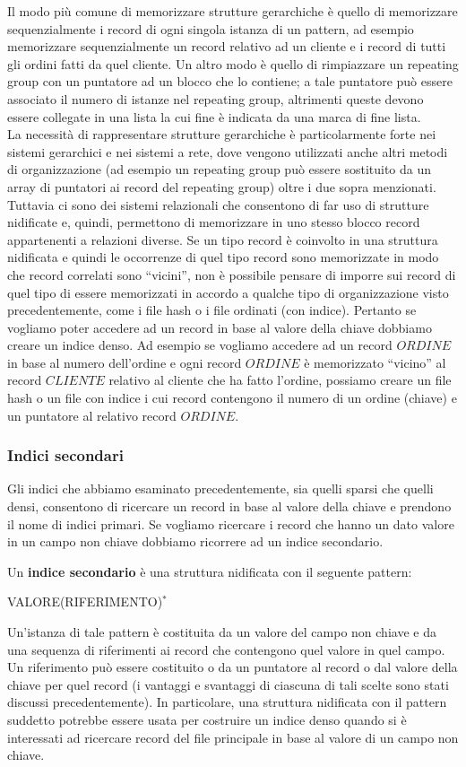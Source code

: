 Il modo più comune di memorizzare strutture gerarchiche è quello di memorizzare sequenzialmente
i record di ogni singola istanza di un pattern, ad esempio memorizzare sequenzialmente un record
relativo ad un cliente e i record di tutti gli ordini fatti da quel cliente. Un altro modo è quello di
rimpiazzare un repeating group con un puntatore ad un blocco che lo contiene; a tale puntatore può
essere associato il numero di istanze nel repeating group, altrimenti queste devono essere collegate
in una lista la cui fine è indicata da una marca di fine lista.\\
La necessità di rappresentare strutture gerarchiche è particolarmente forte nei sistemi gerarchici e
nei sistemi a rete, dove vengono utilizzati anche altri metodi di organizzazione (ad esempio un
repeating group può essere sostituito da un array di puntatori ai record del repeating group) oltre i
due sopra menzionati. Tuttavia ci sono dei sistemi relazionali che consentono di far uso di strutture
nidificate e, quindi, permettono di memorizzare in uno stesso blocco record appartenenti a relazioni
diverse.
Se un tipo record è coinvolto in una struttura nidificata e quindi le occorrenze di quel tipo record
sono memorizzate in modo che record correlati sono ``vicini'', non è possibile pensare di imporre sui
record di quel tipo di essere memorizzati in accordo a qualche tipo di organizzazione visto
precedentemente, come i file hash o i file ordinati (con indice). Pertanto se vogliamo poter accedere
ad un record in base al valore della chiave dobbiamo creare un indice denso. Ad esempio se
vogliamo accedere ad un record $ORDINE$ in base al numero dell'ordine e ogni record $ORDINE$ è
memorizzato ``vicino'' al record $CLIENTE$ relativo al cliente che ha fatto l'ordine, possiamo creare
un file hash o un file con indice i cui record contengono il numero di un ordine (chiave) e un
puntatore al relativo record $ORDINE$.

\subsubsection{Indici secondari}
Gli indici che abbiamo esaminato precedentemente, sia quelli sparsi che quelli densi, consentono di
ricercare un record in base al valore della chiave e prendono il nome di indici primari. Se vogliamo
ricercare i record che hanno un dato valore in un campo non chiave dobbiamo ricorrere ad un indice
secondario. 
\begin{defn}
 Un \textbf{indice secondario} è una struttura nidificata con il seguente pattern:
 \begin{center}
VALORE(RIFERIMENTO)$^*$  
 \end{center}
\end{defn}
Un'istanza di tale pattern è costituita da un valore del campo non chiave e da una sequenza di
riferimenti ai record che contengono quel valore in quel campo. Un riferimento può essere costituito
o da un puntatore al record o dal valore della chiave per quel record (i vantaggi e svantaggi di
ciascuna di tali scelte sono stati discussi precedentemente). In particolare, una struttura nidificata
con il pattern suddetto potrebbe essere usata per costruire un indice denso quando si è interessati ad
ricercare record del file principale in base al valore di un campo non chiave.
